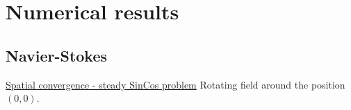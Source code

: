 \documentclass{beamer}
\begin{document}
\section{Numerical results}
\subsection*{Navier-Stokes}
\begin{frame}[label=spaceconv]{\hyperlink{spaceconvSupp}{Spatial convergence - 
steady SinCos problem}}
\vspace{0.5cm}
Rotating field around the position $(0,0)$.
\vspace{-0.5cm}
\begin{figure}
	\centering
\end{figure}
\end{frame}
\end{document}
